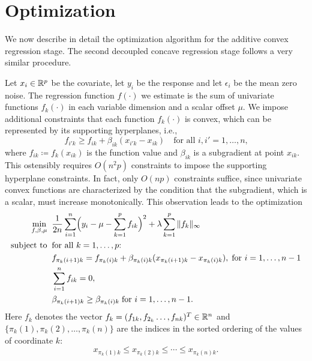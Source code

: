 \def\uds#1{#1}
\def\perm#1{\pi_k(#1)}

\section{Optimization}
\label{sec:optimization}

We now describe in detail the optimization algorithm for the additive
convex regression stage.  The second decoupled concave regression stage
follows a very similar procedure.

Let $x_{i}\in\mathbb{R}^{p}$ be the covariate, let $y_{i}$ be
the response and let $\epsilon_{i}$ be the mean zero noise. The
regression function $f(\cdot)$ we estimate is the sum of
univariate functions $f_{k}(\cdot)$ in each variable dimension and a scalar
offset $\mu$.  We impose additional constraints that each
function $f_{k}(\cdot)$ is convex, which can be
represented by its supporting hyperplanes, i.e.,
\begin{equation}\label{hyper}
      f_{i'k} \geq f_{ik} + \beta_{ik}(x_{i'k}-x_{ik}) \quad
      \textrm{for all $i,i' = 1,\ldots, n$,}
\end{equation}
where $f_{ik}\coloneqq f_{k}(x_{ik})$ is the function value and $\beta_{ik}$ is a
subgradient at point $x_{ik}$. This ostensibly requires $O(n^2 p)$ constraints to
impose the supporting hyperplane constraints.
In fact, only $O(np)$
constraints suffice, since univariate convex functions are
characterized by the condition that the subgradient, which is a scalar, must
increase monotonically. This observation leads to the  optimization
\begin{equation}
\begin{split}
       \min_{f,\beta,\mu} & \;\; \frac{1}{2n}\sum_{i=1}^{n}
                     \Bigl( y_{i}-\mu - \sum_{k=1}^{p}f_{ik}\Bigr)^{2} 
                         + \lambda\sum_{k=1}^{p}\|f_k\|_{\infty} \\
       \textrm{subject to} &\;\; \textrm{for all $k=1,\ldots, p$:}\\
       & \;\; f_{\perm{i+1} k} = f_{\perm{i} k} +
       \beta_{\perm{i} k}(x_{\perm{i+1} k}-x_{\perm{i} k}),\;\textrm{for $i=1,\ldots, n-1$}\\
       & \;\; \sum_{i=1}^{n}f_{ik}=0,\\
       & \;\; \beta_{\perm{i+1} k} \geq \beta_{\perm{i} k}\;\textrm{for $i=1,\ldots, n-1$}.
\end{split}
\label{np}
\end{equation}
Here $f_k$ denotes the vector $f_k = (f_{1k}, f_{2_k}\ldots, f_{nk})^T\in{\mathbb R}^n$
and $\{\perm{1},\perm{2},\ldots,\perm{n}\}$ are the indices in the sorted ordering
of the values of coordinate $k$:
\begin{equation}
x_{\perm{1} k} \leq{} x_{\perm{2} k} \leq \cdots \leq{} x_{\perm{n} k}.
\end{equation}


